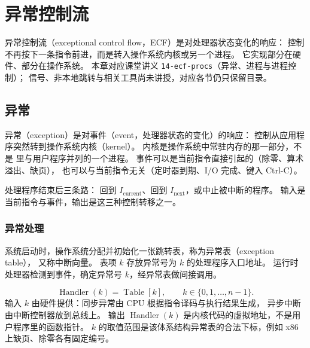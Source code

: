 \chapter{异常控制流}

异常控制流（exceptional control flow，ECF）是对处理器状态变化的响应：
控制不再按下一条指令前进，而是转入操作系统内核或另一个进程。
它实现部分在硬件、部分在操作系统。
本章对应课堂讲义 \texttt{14-ecf-procs}（异常、进程与进程控制）；
信号、非本地跳转与相关工具尚未讲授，对应各节仍只保留目录。

\section{异常}

异常（exception）是对事件（event，处理器状态的变化）的响应：
控制从应用程序突然转到操作系统内核（kernel）。
内核是操作系统中常驻内存的那一部分，不是  里与用户程序并列的一个进程。
事件可以是当前指令直接引起的（除零、算术溢出、缺页），
也可以与当前指令无关（定时器到期、I/O 完成、键入 Ctrl-C）。


处理程序结束后三条路：
回到 $I_{\mathrm{current}}$、回到 $I_{\mathrm{next}}$，或中止被中断的程序。
输入是当前指令与事件，输出是这三种控制转移之一。

\subsection{异常处理}

系统启动时，操作系统分配并初始化一张跳转表，称为异常表（exception table），
又称中断向量。
表项 $k$ 存放异常号为 $k$ 的处理程序入口地址。
运行时处理器检测到事件，确定异常号 $k$，经异常表做间接调用。


\[
\operatorname{Handler}(k)=\operatorname{Table}[k],
\qquad
k\in\{0,1,\ldots,n-1\}.
\]
输入 $k$ 由硬件提供：同步异常由 CPU 根据指令译码与执行结果生成，
异步中断由中断控制器放到总线上。
输出 $\operatorname{Handler}(k)$ 是内核代码的虚拟地址，不是用户程序里的函数指针。
$k$ 的取值范围是该体系结构异常表的合法下标，例如 x86 上缺页、除零各有固定编号。

